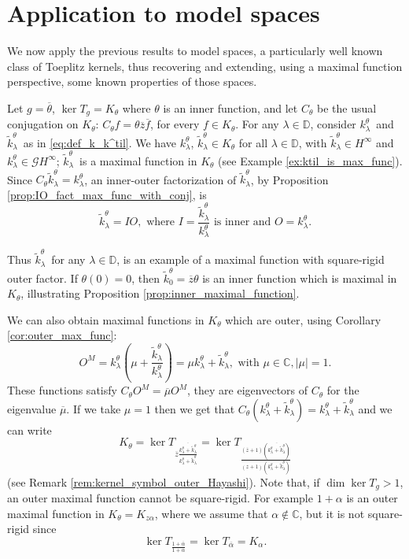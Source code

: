 \documentclass[12pt]{elsarticle}
\numberwithin{equation}{section}
\theoremstyle{plain}
\newcommand{\Hinf}{\ensuremath{H^\infty}}
\newcommand{\DD}{\ensuremath{\mathbb{D}}}
\newcommand{\CC}{\ensuremath{\mathbb{C}}}
\newcommand{\GG}{\ensuremath{\mathcal{G}}}
\newcommand{\ol}[1]{\ensuremath{\overline{#1}}}
\newcommand{\kktil}{\ensuremath{\tilde k^\theta_\lambda}}
\newcommand{\kk}{\ensuremath{k^\theta_\lambda}}
\begin{document}
 

\section{Application to model spaces}
\label{sec:Applications}

We now apply the previous results to model spaces, a particularly well known class of Toeplitz kernels, thus recovering and extending, using a maximal function perspective, some known properties of those spaces.


Let $g=\ol \theta$, $\ker T_g = K_\theta$ where $\theta$ is an inner function, and let $C_\theta$ be the usual conjugation on $K_\theta$: $C_\theta f = \theta \ol z \ol f$, for every $f\in K_\theta$.
For any $\lambda\in\DD$, consider \kk\ and \kktil\ as in \eqref{eq:def_k_k^til}.
We have \kk, $\kktil\in K_\theta$ for all $\lambda\in\DD$, with $\kktil\in\Hinf$ and $\kk \in \GG\Hinf$;
\kktil\ is a maximal function in $K_\theta$ (see Example \ref{ex:ktil_is_max_func}).
Since $C_\theta \kktil = \kk$, an inner-outer factorization of \kktil, by Proposition \ref{prop:IO_fact_max_func_with_conj}, is
\begin{equation}
\label{eq:ktil_IO_fact}
\kktil = I O, \text{ where } I = \frac{\kktil}{\kk} \text{ is inner and } O=\kk.
\end{equation}


Thus \kktil\, for any $\lambda \in\DD$, is an example of a maximal function with square-rigid outer factor.
If $\theta(0) = 0$, then $\tilde k^\theta_0 = \ol z \theta$ is an inner function which is maximal in $K_\theta$, illustrating Proposition \ref{prop:inner_maximal_function}.

We can also obtain maximal functions in $K_\theta$ which are outer, using Corollary \ref{cor:outer_max_func}:
\begin{equation*}
O^M = \kk \left(\mu + \frac{\kktil}{\kk} \right) = \mu \kk + \kktil, \text{ with } \mu\in\CC, |\mu|=1.
\end{equation*}
These functions satisfy $C_\theta O^M = \ol \mu O^M$, they are eigenvectors of $C_\theta$ for the eigenvalue $\ol\mu$.
If we take $\mu=1$ then we get that $C_\theta (\kk + \kktil) = \kk + \kktil$ and we can write
\begin{equation}
K_\theta = \ker T_{\ol z \frac{\ol{\kk + \kktil}}{\kk + \kktil}} = \ker T_\frac{(\ol z + 1) (\ol{\kk + \kktil})}{(z+1) (\kk + \kktil)}
\end{equation}
(see Remark \ref{rem:kernel_symbol_outer_Hayashi}).
Note that, if $\dim\ker T_g >1$, an outer maximal function cannot be square-rigid.
For example $1+\alpha$ is an outer maximal function in $K_\theta = K_{z\alpha}$, where we assume that $\alpha\notin\CC$, but it is not square-rigid since
\begin{equation*}
\ker T_{\frac{1+\ol\alpha}{1+\alpha}} = \ker T_{\ol\alpha} = K_\alpha.
\end{equation*}
\end{document}
